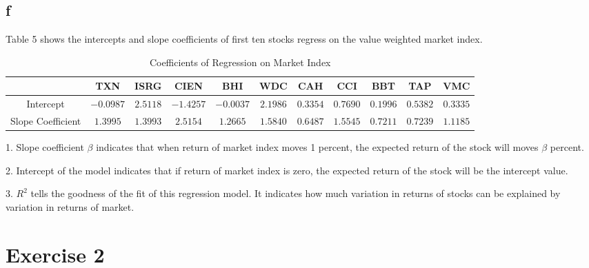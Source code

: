 \documentclass{report}
\begin{document}
\subsection{f}
Table 5 shows the intercepts and slope coefficients of first ten stocks regress on the value weighted market index.
\begin{table}[H]
\centering
\begin{tabular}{|c|c|c|c|c|c|c|c|c|c|c|}
\hline
 &TXN&ISRG &CIEN &BHI &WDC &CAH &CCI & BBT& TAP &VMC\\
\hline
Intercept& $-0.0987$ & $2.5118$ & $-1.4257$& $-0.0037$ & $2.1986$ & $0.3354$ & $0.7690$ & $0.1996$ & $0.5382$ & $0.3335$\\
\hline
Slope Coefficient &$1.3995$ & $1.3993$ & $2.5154$& $1.2665$ & $1.5840$ & $0.6487$ & $1.5545$ & $0.7211$ & $0.7239$ & $1.1185$\\
\hline
\end{tabular}
\caption{ Coefficients of Regression on Market Index }
\end{table}
1. Slope coefficient $\beta$ indicates that when return of market index moves 1 percent, the expected return of the stock will moves $\beta$ percent.

2. Intercept of the model indicates that if return of market index is zero, the expected return of the stock will be the intercept value.

3. $ R^{2}$ tells the goodness of the fit of this regression model. It indicates how much variation in returns of stocks can be explained by variation in returns of market.

\section{ Exercise 2}
\end{document}
